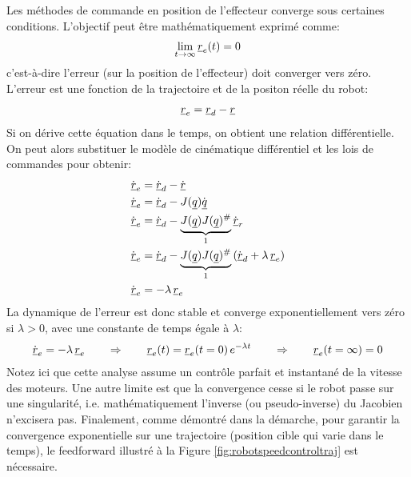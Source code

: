 Les méthodes de commande en position de l'effecteur converge sous certaines conditions. L'objectif peut être mathématiquement exprimé comme:
\begin{align}
\lim_{t \rightarrow \infty } \underline{r}_e(t) = 0 
\end{align}
c'est-à-dire l'erreur (sur la position de l'effecteur) doit converger vers zéro. L'erreur est une fonction de la trajectoire et de la positon réelle du robot:
\begin{align}
\underline{r}_e = \underline{r}_d - \underline{r}
\end{align}
Si on dérive cette équation dans le temps, on obtient une relation différentielle. On peut alors substituer le modèle de cinématique différentiel et les lois de commandes pour obtenir:
\begin{align}
\dot{\underline{r}}_e  &= \dot{\underline{r}}_d - \dot{\underline{r}} \\
\dot{\underline{r}}_e  &= \dot{\underline{r}}_d - J(\underline{q}) \dot{\underline{q}} \\
\dot{\underline{r}}_e  &= \dot{\underline{r}}_d - \underbrace{J(\underline{q}) J(\underline{q})^{\#} }_{1} \dot{\underline{r}}_r \\
\dot{\underline{r}}_e  &= \dot{\underline{r}}_d - \underbrace{J(\underline{q}) J(\underline{q})^{\#} }_{1}  \left( \dot{\underline{r}}_d + \lambda \, \underline{r}_e \right) \\
\dot{\underline{r}}_e  &= - \lambda \, \underline{r}_e  
\end{align}
La dynamique de l'erreur est donc stable et converge exponentiellement vers zéro si $\lambda>0$, avec une constante de temps égale à $\lambda$:
\begin{align}
\dot{\underline{r}}_e = - \lambda \, \underline{r}_e 
\quad\quad \Rightarrow \quad\quad 
\underline{r}_e(t) = \underline{r}_e(t=0) \, e^{- \lambda t} 
\quad\quad \Rightarrow \quad\quad 
\underline{r}_e(t=\infty) = 0
\end{align}
Notez ici que cette analyse assume un contrôle parfait et instantané de la vitesse des moteurs. Une autre limite est que la convergence cesse si le robot passe sur une singularité, i.e. mathématiquement l'inverse (ou pseudo-inverse) du Jacobien n'excisera pas. Finalement, comme démontré dans la démarche, pour garantir la convergence exponentielle sur une trajectoire (position cible qui varie dans le temps), le feedforward illustré à la Figure \ref{fig:robotspeedcontroltraj} est nécessaire.



